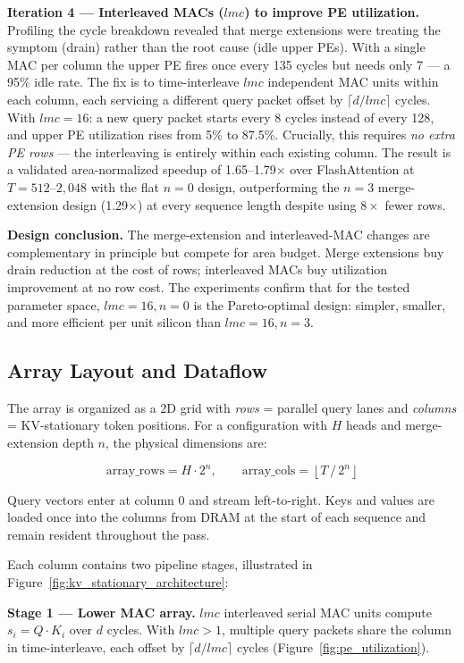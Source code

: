 \documentclass[11pt]{article}
\begin{document}
\textbf{Iteration 4 --- Interleaved MACs (\(lmc\)) to improve PE utilization.}
Profiling the cycle breakdown revealed that merge extensions
were treating the symptom (drain) rather than the root cause
(idle upper PEs).
With a single MAC per column the upper PE fires once every
135 cycles but needs only 7 --- a 95\% idle rate.
The fix is to time-interleave \(lmc\) independent MAC units
within each column, each servicing a different query packet
offset by \(\lceil d / lmc \rceil\) cycles.
With \(lmc = 16\): a new query packet starts every 8 cycles
instead of every 128, and upper PE utilization rises from
5\% to 87.5\%.
Crucially, this requires \textit{no extra PE rows} ---
the interleaving is entirely within each existing column.
The result is a validated area-normalized speedup of
1.65--1.79$\times$ over FlashAttention at \(T = 512\)--\(2{,}048\)
with the flat \(n = 0\) design, outperforming the
\(n = 3\) merge-extension design (1.29$\times$) at every
sequence length despite using \(8\times\) fewer rows.

\textbf{Design conclusion.}
The merge-extension and interleaved-MAC changes are
complementary in principle but compete for area budget.
Merge extensions buy drain reduction at the cost of rows;
interleaved MACs buy utilization improvement at no row cost.
The experiments confirm that for the tested parameter space,
\(lmc = 16, n = 0\) is the Pareto-optimal design: simpler,
smaller, and more efficient per unit silicon than
\(lmc = 16, n = 3\).

\subsection{Array Layout and Dataflow}

The array is organized as a 2D grid with
\textit{rows} = parallel query lanes and
\textit{columns} = KV-stationary token positions.
For a configuration with \(H\) heads and merge-extension
depth \(n\), the physical dimensions are:

\[
\text{array\_rows} = H \cdot 2^n, \qquad
\text{array\_cols} = \left\lfloor T \,/\, 2^n \right\rfloor
\]

Query vectors enter at column 0 and stream left-to-right.
Keys and values are loaded once into the columns from DRAM
at the start of each sequence and remain resident throughout
the pass.

Each column contains two pipeline stages, illustrated in
Figure~\ref{fig:kv_stationary_architecture}:

\textbf{Stage 1 --- Lower MAC array.}
\(lmc\) interleaved serial MAC units compute
\(s_i = Q \cdot K_i\) over \(d\) cycles.
With \(lmc > 1\), multiple query packets share the column
in time-interleave, each offset by
\(\lceil d / lmc \rceil\) cycles (Figure~\ref{fig:pe_utilization}).
\end{document}
